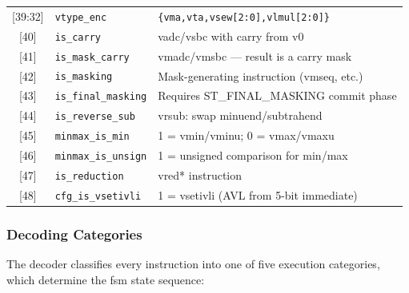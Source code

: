 \begin{table}[H]
\begin{tabular}{clp{7cm}}
{[39:32]} & \texttt{vtype\_enc}         & \texttt{\{vma,vta,vsew[2:0],vlmul[2:0]\}} \\
{[40]}    & \texttt{is\_carry}          & vadc/vsbc with carry from v0 \\
{[41]}    & \texttt{is\_mask\_carry}    & vmadc/vmsbc — result is a carry mask \\
{[42]}    & \texttt{is\_masking}        & Mask-generating instruction (vmseq, etc.) \\
{[43]}    & \texttt{is\_final\_masking} & Requires ST\_FINAL\_MASKING commit phase \\
{[44]}    & \texttt{is\_reverse\_sub}   & vrsub: swap minuend/subtrahend \\
{[45]}    & \texttt{minmax\_is\_min}    & 1 = vmin/vminu; 0 = vmax/vmaxu \\
{[46]}    & \texttt{minmax\_is\_unsign} & 1 = unsigned comparison for min/max \\
{[47]}    & \texttt{is\_reduction}      & vred* instruction \\
{[48]}    & \texttt{cfg\_is\_vsetivli}  & 1 = vsetivli (AVL from 5-bit immediate) \\
\bottomrule
\end{tabular}
\end{table}

\subsubsection{Decoding Categories}

The decoder classifies every instruction into one of five execution categories, which
determine the \gls{fsm} state sequence:

